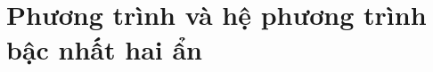 \documentclass[12pt,a4paper,oneside]{book}
\begin{document}
	\thispagestyle{empty}
	
	\pagestyle{plain}
	\tableofcontents
	\chapter{Phương trình và hệ phương trình bậc nhất hai ẩn}
	\newpage
	
	\newpage
	
	\newpage
	
	\newpage
	
	\newpage
	
\end{document}
